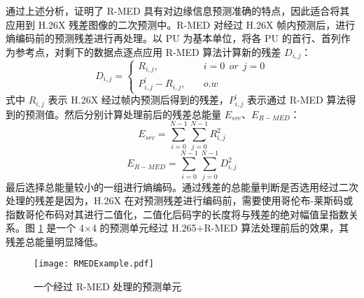通过上述分析，证明了 R-MED 具有对边缘信息预测准确的特点，因此适合将其应用到 H.26X 残差图像的二次预测中。R-MED 对经过 H.26X 帧内预测后，进行熵编码前的预测残差进行再处理。以 PU 为基本单位，将各 PU 的首行、首列作为参考点，对剩下的数据点逐点应用 R-MED 算法计算新的残差 $D_{i,j}$：
\begin{equation}
    D_{i,j}=\left\{
    \begin{aligned}
        R_{i,j}, \quad             & i=0 \ \ or \ \ j=0 \\
        P_{i,j}^{'}-R_{i,j}, \quad & o.w
    \end{aligned}
    \right.
\end{equation}
式中 $R_{i,j}$ 表示 H.26X 经过帧内预测后得到的残差，$P_{i,j}^{'}$ 表示通过 R-MED 算法得到的预测值。然后分别计算处理前后的残差总能量 $E_{src}$、$E_{R-MED}$：
\begin{equation}
    E_{src}=\sum_{i=0}^{N-1} \sum_{j=0}^{N-1} R_{i,j}^{2}
\end{equation}
\begin{equation}
    E_{R-MED}=\sum_{i=0}^{N-1} \sum_{j=0}^{N-1} D_{i,j}^{2}
\end{equation}
最后选择总能量较小的一组进行熵编码。通过残差的总能量判断是否选用经过二次处理的残差是因为，H.26X 在对预测残差进行编码前，需要使用哥伦布-莱斯码或指数哥伦布码对其进行二值化，二值化后码字的长度将与残差的绝对幅值呈指数关系。图 \ref{fig:RMEDExample} 是一个 4$\times$4 的预测单元经过 H.265+R-MED 算法处理前后的效果，其残差总能量明显降低。
\begin{figure}[hbt]
    \centering
    \texttt{[image: RMEDExample.pdf]}
    \caption{一个经过 R-MED 处理的预测单元}
    \label{fig:RMEDExample}
\end{figure}

